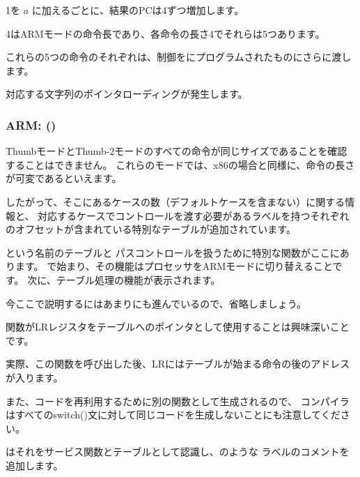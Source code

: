 1を $a$ に加えるごとに、結果の\ac{PC}は4ずつ増加します。

4はARMモードの命令長であり、各命令の長さ4でそれらは5つあります。

これらの5つの命令のそれぞれは、制御をにプログラムされたものにさらに渡します。

対応する文字列のポインタローディングが発生します。

\subsubsection{ARM: \OptimizingKeilVI (\ThumbMode)}




ThumbモードとThumb-2モードのすべての命令が同じサイズであることを確認することはできません。
これらのモードでは、x86の場合と同様に、命令の長さが可変であるといえます。


したがって、そこにあるケースの数（デフォルトケースを含まない）に関する情報と、
対応するケースでコントロールを渡す必要があるラベルを持つそれぞれのオフセットが含まれている特別なテーブルが追加されています。


という名前のテーブルと
パスコントロールを扱うために特別な関数がここにあります。
で始まり、その機能はプロセッサをARMモードに切り替えることです。
次に、テーブル処理の機能が表示されます。

今ここで説明するにはあまりにも進んでいるので、省略しましょう。


関数が\ac{LR}レジスタをテーブルへのポインタとして使用することは興味深いことです。

実際、この関数を呼び出した後、\ac{LR}にはテーブルが始まる命令の後のアドレスが入ります。

また、コードを再利用するために別の関数として生成されるので、
コンパイラはすべてのswitch()文に対して同じコードを生成しないことにも注意してください。

\IDA はそれをサービス関数とテーブルとして認識し、のような
ラベルのコメントを追加します。

